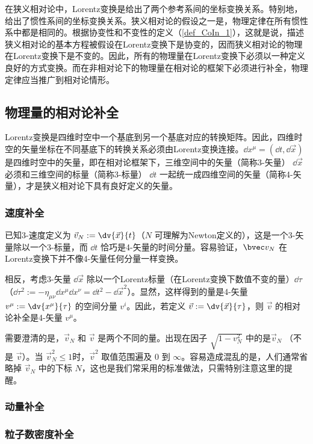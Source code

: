 
在狭义相对论中，Lorentz变换是给出了两个参考系间的坐标变换关系。特别地，给出了惯性系间的坐标变换关系。狭义相对论的假设之一是，物理定律在所有惯性系中都是相同的。根据协变性和不变性的定义（\autoref{def_CoIn_1}），这就是说，描述狭义相对论的基本方程被假设在Lorentz变换下是协变的，因而狭义相对论的物理在Lorentz变换下是不变的。因此，所有的物理量在Lorentz变换下必须以一种定义良好的方式变换。而在非相对论下的物理量在相对论的框架下必须进行补全，物理定律应当推广到相对论情形。
\subsection{物理量的相对论补全}
Lorentz变换是四维时空中一个基底到另一个基底对应的转换矩阵。因此，四维时空的矢量坐标在不同基底下的转换关系必须由Lorentz变换连接。$\dd x^\mu=(\dd t,\dd{\vec x})$ 是四维时空中的矢量，即在相对论框架下，三维空间中的矢量（简称3-矢量） $\dd{\vec x}$ 必须和三维空间的标量（简称3-标量） $\dd t$ 一起统一成四维空间的矢量（简称4-矢量），才是狭义相对论下具有良好定义的矢量。

\subsubsection{速度补全}
已知3-速度定义为 $\vec v_N:=\dv{\vec x}{t}$（$N$ 可理解为Newton定义的），这是一个3-矢量除以一个3-标量，而 $\dd t$ 恰巧是4-矢量的时间分量。容易验证，$\bvec v_N$ 在Lorentz变换下并不像4-矢量任何分量一样变换。

相反，考虑3-矢量 $\dd{\vec x}$ 除以一个Lorentz标量（在Lorentz变换下数值不变的量）$\dd\tau$ （$\dd \tau^2:=-\eta_{\mu\nu}\dd x^{\mu}\dd x^\nu=\dd t^2-\dd {\vec x^2}$）。显然，这样得到的量是4-矢量 $v^\mu:=\dv{x^\mu}{\tau}$ 的空间分量 $v^i$。因此，若定义 $\vec v:=\dv{\vec x}{\tau}$，则 $\vec v$ 的相对论补全是4-矢量 $v^\mu$。

需要澄清的是，$\vec v_N$ 和 $\vec v$ 是两个不同的量。出现在因子 $\sqrt{1-v_N^2}$ 中的是$\vec v_N$ （不是 $\vec v$）。当 $\vec v_N^2\leq1$时，$\vec v^2$ 取值范围遍及 $0$ 到 $\infty$。容易造成混乱的是，人们通常省略掉 $\vec v_N$ 中的下标 $N$，这也是我们常采用的标准做法，只需特别注意这里的提醒。

\subsubsection{动量补全}

\subsubsection{粒子数密度补全}